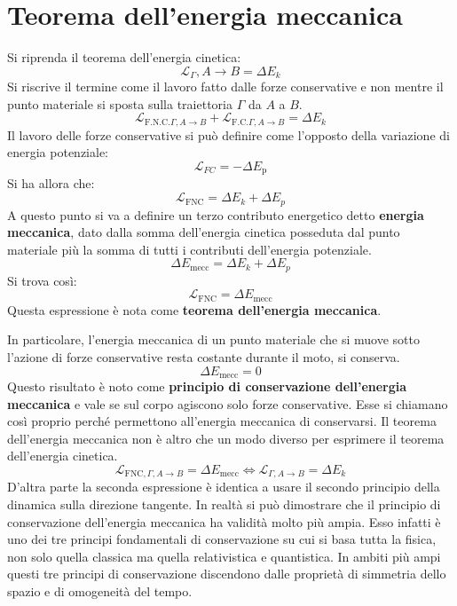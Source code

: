 \documentclass[10pt,a4paper]{book}
\begin{document}
\section{Teorema dell'energia meccanica}

Si riprenda il teorema dell'energia cinetica:
\[
	\mathcal{L}_\Gamma, A\to B= \Delta E_k
\]
Si riscrive il termine come il lavoro fatto dalle forze conservative e non mentre il punto materiale si sposta sulla traiettoria $\Gamma$ da $A$ a $B$.
\[
	\mathcal{L}_{\text{F.N.C.} \Gamma, A \to B}+\mathcal{L}_{\text{F.C.} \Gamma, A \to B}=\Delta E_k
\]
Il lavoro delle forze conservative si può definire come l'opposto della variazione di energia potenziale:
\[
	\mathcal{L}_{FC}=-\Delta E_{\text{p}}
\]
Si ha allora che:
\[
	\boxed{\mathcal{L}_{\text{FNC}}=\Delta E_k + \Delta E_p}
\]
A questo punto si va a definire un terzo contributo energetico detto \textbf{energia meccanica}, dato dalla somma dell'energia cinetica posseduta dal punto materiale più la somma di tutti i contributi dell'energia potenziale.
\[
	\boxed{\Delta E_{\text{mecc}}=\Delta E_k + \Delta E_p}
\]
Si trova così:
\[
	\mathcal{L}_{\text{FNC}}=\Delta E_\text{mecc}
\]
Questa espressione è nota come \textbf{teorema dell'energia meccanica}.

In particolare, l'energia meccanica di un punto materiale che si muove sotto l'azione di forze conservative resta costante durante il moto, si conserva.
\[
	\Delta E_{\text{mecc}}=0
\]
Questo risultato è noto come \textbf{principio di conservazione dell'energia meccanica} e vale se sul corpo agiscono solo forze conservative. Esse si chiamano così proprio perché permettono all'energia meccanica di conservarsi. Il teorema dell'energia meccanica non è altro che un modo diverso per esprimere il teorema dell'energia cinetica.
\[
	\boxed{\mathcal{L}_{\text{FNC}, \Gamma, A \to B}= \Delta E_{\text{mecc}} \iff \mathcal{L}_{\Gamma, A \to B}= \Delta E_k}
\]
D'altra parte la seconda espressione è identica a usare il secondo principio della dinamica sulla direzione tangente. In realtà si può dimostrare che il principio di conservazione dell'energia meccanica ha validità molto più ampia. Esso infatti è uno dei tre principi fondamentali di conservazione su cui si basa tutta la fisica, non solo quella classica ma quella relativistica e quantistica. In ambiti più ampi questi tre principi di conservazione discendono dalle proprietà di simmetria dello spazio e di omogeneità del tempo.
\end{document}
